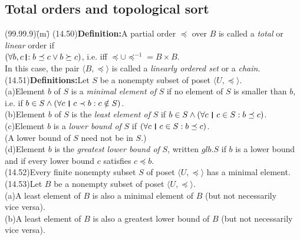\documentclass{amsart}
\newcommand{\lgap}{2pt}                             %
\newcommand{\llgap}{6pt}                            %
\newcommand{\thedr}{\rule[-.25ex]{.32mm}{1.75ex}}   %
\newcommand{\dr}{\;\,\thedr\,\;}                    %
\newcommand{\rb}{:}                                 %
\newcommand{\drrb}{\;\thedr\,{:}\;}                 %
\newcommand{\all}{\forall}                          %
\begin{document}
\subsection*{Total orders and topological sort}
\begin{tabbing}
(99.99.9)\;\=(m)\;\=\kill
(14.50)\>\textbf{Definition:}\quad A partial order $\preceq$ over $B$ is called a \emph{total} or \emph{linear} order if\\[\lgap]
       \>$(\all b,c\drrb b\preceq c \lor b\succeq c)$, i.e. iff $\preceq\cup\preceq^{-1} = B\times B$.\\[\lgap]
       \> In this case, the pair $\langle B,\preceq\rangle$ is called a \emph{linearly ordered set} or a \emph{chain}.\\[\llgap]
(14.51)\>\textbf{Definitions:}\quad Let $S$ be a nonempty subset of poset $\langle U,\preceq\rangle$.\\[\lgap]
       \>(a)\>Element $b$ of $S$ is a \emph{minimal element of} $S$ if no element of $S$ is smaller than $b$,\\[\lgap]
       \>   \>i.e. if $b\in S\land (\all c\dr c \prec b\rb c\notin S)$.\\[\lgap]
       \>(b)\>Element $b$ of $S$ is the \emph{least element of} $S$ if $b\in S\land (\all c\dr c\in S\rb b\preceq c)$.\\[\lgap]
       \>(c)\>Element $b$ is a \emph{lower bound of} $S$ if $(\all c\dr c\in S\rb b\preceq c)$.\\[\lgap]
       \>   \>(A lower bound of $S$ need not be in $S$.)\\[\lgap]
       \>(d)\>Element $b$ is the \emph{greatest lower bound of} $S$, written $glb.S$ if $b$ is a lower bound\\[\lgap]
       \>   \>and if every lower bound $c$ satisfies $c\preceq b$.\\[\llgap]
(14.52)\>Every finite nonempty subset $S$ of poset $\langle U, \preceq\rangle$ has a minimal element.\\[\llgap]
(14.53)\>Let $B$ be a nonempty subset of poset $\langle U, \preceq\rangle$.\\[\lgap]
       \>(a)\>A least element of $B$ is also a minimal element of $B$ (but not necessarily\\[\lgap]
       \>   \>vice versa).\\[\lgap]
       \>(b)\>A least element of $B$ is also a greatest lower bound of $B$ (but not necessarily\\[\lgap]
       \>   \>vice versa).\\[\lgap]

\end{tabbing}
\end{document}
